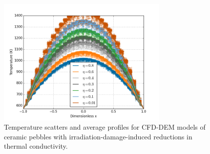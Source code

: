 \begin{figure}[ht]
    \centering
    \includegraphics[width = 0.75\textwidth]{figures/irradiated/irradiated-temperatures-cfd-q.png}
    \caption{Temperature scatters and average profiles for CFD-DEM models of ceramic pebbles with irradiation-damage-induced reductions in thermal conductivity.}\label{fig:irrad-temps-cfd-q}
\end{figure}

